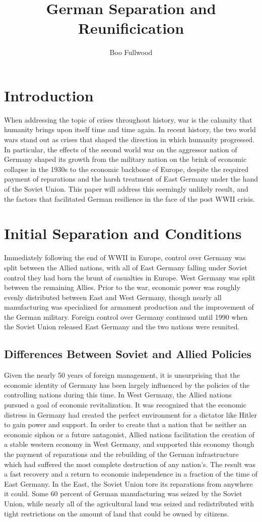 \documentclass[12pt,a4paper,titlepage,oneside,]{article}
\begin{document}
\title{German Separation and Reunificication}
\author{Boo Fullwood}

\maketitle
\section*{Introduction}
When addressing the topic of crises throughout history, war is the calamity that humanity brings upon itself time and time again. In recent history, the two world wars stand out as crises that shaped the direction in which humanity progressed. In particular, the effects of the second world war on the aggressor nation of Germany shaped its growth from the military nation on the brink of economic collapse in the 1930s to the economic backbone of Europe, despite the required payment of reparations and the harsh treatment of East Germany under the hand of the Soviet Union. This paper will address this seemingly unlikely result, and the factors that facilitated German resilience in the face of the post WWII crisis.
\section*{Initial Separation and Conditions}
Immediately following the end of WWII in Europe, control over Germany was split between the Allied nations, with all of East Germany falling under Soviet control they had born the brunt of casualties in Europe. West Germany was split between the remaining Allies. Prior to the war, economic power was roughly evenly distributed between East and West Germany, though nearly all manufacturing was specialized for armament production and the improvement of the German military. Foreign control over Germany continued until 1990 when the Soviet Union released East Germany and the two nations were reunited. 
\subsection*{Differences Between Soviet and Allied Policies}
Given the nearly 50 years of foreign management, it is unsurprising that the economic identity of Germany has been largely influenced by the policies of the controlling nations during this time. In West Germany, the Allied nations pursued a goal of economic revitalization. It was recognized that the economic distress in Germany had created the perfect environment for a dictator like Hitler to gain power and support. In order to create that a nation that be neither an economic siphon or a future antagonist, Allied nations facilitation the creation of a stable western economy in West Germany, and supported this economy though the payment of reparations and the rebuilding of the German infrastructure which had suffered the most complete destruction of any nation's. The result was a fast recovery and a return to economic independence in a fraction of the time of East Germany. In the East, the Soviet Union tore its reparations from anywhere it could. Some 60 percent of German manufacturing was seized by the Soviet Union, while nearly all of the agricultural land was seized and redistributed with tight restrictions on the amount of land that could be owned by citizens.
\end{document}
